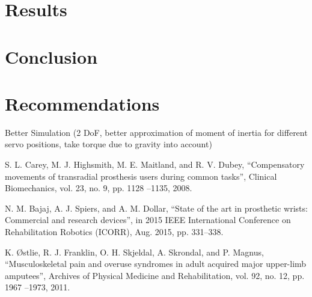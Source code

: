 \documentclass[letterpaper,12pt]{article}
\begin{document}
\section{Results}

\section{Conclusion}

\section{Recommendations}
Better Simulation (2 DoF, better approximation of moment of inertia for different servo positions, take torque due to gravity into account)


\pagebreak

\begin{thebibliography}{99}
S. L. Carey, M. J. Highsmith, M. E. Maitland, and R. V. Dubey, “Compensatory movements
of transradial prosthesis users during common tasks”, Clinical Biomechanics, vol. 23, no. 9,
pp. 1128 –1135, 2008.

N. M. Bajaj, A. J. Spiers, and A. M. Dollar, “State of the art in prosthetic wrists: Commercial and research devices”, in 2015 IEEE International Conference on Rehabilitation Robotics
(ICORR), Aug. 2015, pp. 331–338.

K. Østlie, R. J. Franklin, O. H. Skjeldal, A. Skrondal, and P. Magnus, “Musculoskeletal pain
and overuse syndromes in adult acquired major upper-limb amputees”, Archives of Physical
Medicine and Rehabilitation, vol. 92, no. 12, pp. 1967 –1973, 2011.


\end{thebibliography}
\end{document}
